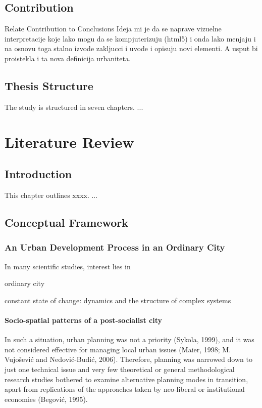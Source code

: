 \documentclass[11pt]{report}
\begin{document}
\section{Contribution}

Relate Contribution to Conclusions
Ideja mi je da se naprave vizuelne interpretacije koje lako mogu da se kompjuterizuju (html5) i onda lako menjaju i na osnovu toga stalno izvode zakljucci i uvode i opisuju novi elementi.
A usput bi proistekla i ta nova definicija urbaniteta.

\section{Thesis Structure}

The study is structured in seven chapters. ...


\chapter{Literature Review}


\section{Introduction}

This chapter outlines xxxx. ...

\section{Conceptual Framework}

\subsection{An Urban Development Process in an Ordinary City}

In many scientific studies, interest lies in

ordinary city

constant state of change: dynamics and the structure of complex systems

\subsubsection{Socio-spatial patterns of a post-socialist city}

In such a situation, urban planning was not a priority (Sykola, 1999), and it was not considered effective for managing local urban issues (Maier, 1998; M. Vujošević and Nedović-Budić, 2006). Therefore, planning was narrowed down to just one technical issue and very few theoretical or general methodological research studies bothered to examine alternative planning modes in transition, apart from replications of the approaches taken by neo-liberal or institutional economies (Begović, 1995).
\end{document}
